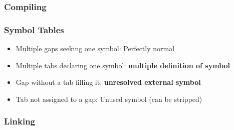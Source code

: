 \documentclass[glossy]{beamer}
\begin{document}

\begin{frame}[fragile=singleslide]
  \frametitle{Compiling}

  \begin{figure}
    \centering
    
  \end{figure}

\end{frame}


\begin{frame}[fragile=singleslide]
  \frametitle{Symbol Tables}

  \begin{figure}
    \centering
    \resizebox{3cm}{!}{}
  \end{figure}


  \begin{itemize}
    \item Multiple gaps seeking one symbol: Perfectly normal
    \item Multiple tabs declaring one symbol: \textbf{multiple definition of symbol}
    \item Gap without a tab filling it: \textbf{unresolved external symbol}
    \item Tab not assigned to a gap: Unused symbol (can be stripped)
  \end{itemize}
\end{frame}


\begin{frame}[fragile=singleslide]
  \frametitle{Linking}

  \begin{figure}
    \centering
    \resizebox{\columnwidth}{!}{}
  \end{figure}
\end{frame}
\end{document}
